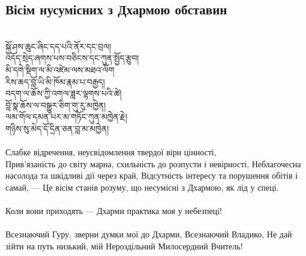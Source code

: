 \subsection*{Вісім нусумісних з Дхармою обставин}
\\
\ti
སྐྱོ་ཤས་ཆུང་ཞིང་དད་པའི་ནོར་དང་བྲལ། \\
འདོད་སྲེད་ཞགས་པས་བཅིངས་དང་ཀུན་སྤྱོད་རྩུབ། \\
མི་དགེ་སྡིག་ལ་མི་འཛེམ་ལས་མཐའ་ལོག \\
རིས་ཆད་བློ་ཡི་མི་ཁོམ་རྣམ་པ་བརྒྱད། \\
བདག་ལ་ཆོས་ཀྱི་འགལ་ཟླར་ལྷགས་པའི་ཚེ། \\
བློ་སྣ་ཆོས་ལ་བསྒྱུར་ཅིག་གུ་རུ་མཁྱེན། \\
ལམ་གོལ་དམན་པར་མ་གཏོང་ཀུན་མཁྱེན་རྗེ། \\
གཉིས་སུ་མེད་དོ་དྲིན་ཅན་བླ་མ་མཁྱེན། \\
\\
\ru
Слабке відречення, неусвідомлення твердої віри цінності,\\
Прив'язаність до світу марна, схильність до розпусти і невірності,
Неблагочесна насолода та шкідливі дії через край,
Відсутність інтересу та порушення обітів і самай, ---
Це вісім станів розуму, що несумісні з Дхармою, як лід у спеці.\\
\\
Коли вони приходять --- Дхарми практика моя у небезпеці!\\
\\
Всезнаючий Гуру, зверни думки мої до Дхарми, Всезнаючий Владико,
Не дай зійти на путь низький, мій Нероздільний Милосердний Вчитель!\\

\newpage
